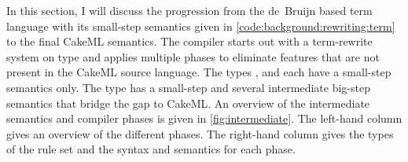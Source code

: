 

\noindent
In this section, I will discuss the progression from the de~Bruijn based term language with its small-step semantics given in \cref{code:background:rewriting:term} to the final CakeML semantics.
The compiler starts out with a term-rewrite system on type  and applies multiple phases to eliminate features that are not present in the CakeML source language.
The types ,  and  each have a small-step semantics only.
The type  has a small-step and several intermediate big-step semantics that bridge the gap to CakeML.
An overview of the intermediate semantics and compiler phases is given in \cref{fig:intermediate}.
The left-hand column gives an overview of the different phases.
The right-hand column gives the types of the rule set and the syntax and semantics for each phase.

